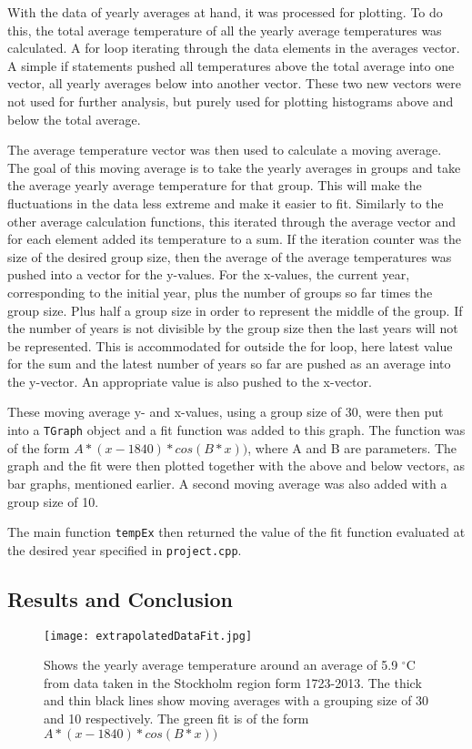 With the data of yearly averages at hand, it was processed for plotting. To do this, the total average temperature of all the yearly average temperatures was calculated. A for loop iterating through the data elements in the averages vector. A simple if statements pushed all temperatures above the total average into one vector, all yearly averages below into another vector. These two new vectors were not used for further analysis, but purely used for plotting histograms above and below the total average.

The average temperature vector was then used to calculate a moving average. The goal of this moving average is to take the yearly averages in groups and take the average yearly average temperature for that group. This will make the fluctuations in the data less extreme and make it easier to fit. Similarly to the other average calculation functions, this iterated through the average vector and for each element added its temperature to a sum. If the iteration counter was the size of the desired group size, then the average of the average temperatures was pushed into a vector for the y-values. For the x-values, the current year, corresponding to the initial year, plus the number of groups so far times the group size. Plus half a group size in order to represent the middle of the group. If the number of years is not divisible by the group size then the last years will not be represented. This is accommodated for outside the for loop, here latest value for the sum and the latest number of years so far are pushed as an average into the y-vector. An appropriate value is also pushed to the x-vector.

These moving average y- and x-values, using a group size of 30, were then put into a \texttt{TGraph} object and a fit function was added to this graph. The function was of the form $A*(x-1840)*cos(B*x))$, where A and B are parameters. The graph and the fit were then plotted together with the above and below vectors, as bar graphs, mentioned earlier. A second moving average was also added with a group size of 10.

The main function \texttt{tempEx} then returned the value of the fit function evaluated at the desired year specified in \texttt{project.cpp}.

\subsection{Results and Conclusion}

\begin{figure}[h!]
\begin{center}
\texttt{[image: extrapolatedDataFit.jpg]}
\caption{\label{fig:extrap1}Shows the yearly average temperature around an average of 5.9 $^{\circ}$C from data taken in the Stockholm region form 1723-2013. The thick and thin black lines show moving averages with a grouping size of 30 and 10 respectively. The green fit is of the form $A*(x-1840)*cos(B*x))$}
\end{center}
\end{figure}

